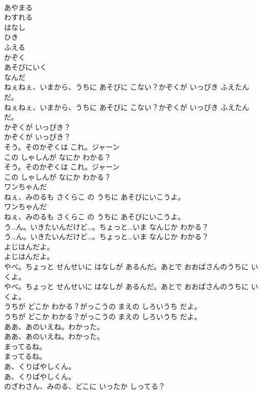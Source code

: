 \documentclass[8pt]{extreport}
\begin{document}
\begin{CJK}{UTF8}{min}
\\	あやまる
\\	わすれる
\\	はなし
\\	ひき
\\	ふえる
\\	かぞく
\\	あそびにいく
\\	なんだ
\\	ねぇねぇ、いまから、うちに あそびに こない？かぞくが いっぴき ふえたんだ。
\\	ねぇねぇ、いまから、うちに あそびに こない？かぞくが いっぴき ふえたんだ。
\\	かぞくが いっぴき？
\\	かぞくが いっぴき？
\\	そう。そのかぞくは これ。ジャーン
\\	この しゃしんが なにか わかる？
\\	そう。そのかぞくは これ。ジャーン
\\	この しゃしんが なにか わかる？
\\	ワンちゃんだ
\\	ねぇ、みのるも さくらこ の うちに あそびにいこうよ。
\\	ワンちゃんだ
\\	ねぇ、みのるも さくらこ の うちに あそびにいこうよ。
\\	う…ん。いきたいんだけど…。ちょっと…いま なんじか わかる？
\\	う…ん。いきたいんだけど…。ちょっと…いま なんじか わかる？
\\	よじはんだよ。
\\	よじはんだよ。
\\	やべ。ちょっと せんせいに はなしが あるんだ。あとで おおばさんのうちに いくよ。
\\	やべ。ちょっと せんせいに はなしが あるんだ。あとで おおばさんのうちに いくよ。
\\	うちが どこか わかる？がっこうの まえの しろいうち だよ。
\\	うちが どこか わかる？がっこうの まえの しろいうち だよ。
\\	ああ、あのいえね。わかった。
\\	ああ、あのいえね。わかった。
\\	まってるね。
\\	まってるね。
\\	あ、くりばやしくん。
\\	あ、くりばやしくん。
\\	のざわさん、みのる、どこに いったか しってる？

\end{CJK}
\end{document}
